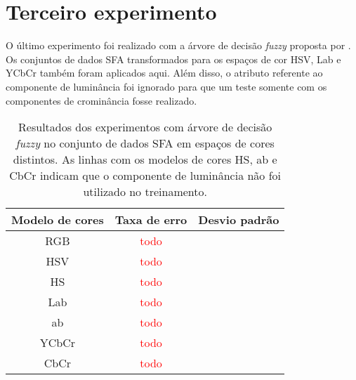 \section{Terceiro experimento}
\label{sec:experimento_tres}
O último experimento foi realizado com a árvore de decisão \emph{fuzzy} proposta por \citet{cintra:13}. Os conjuntos de dados SFA transformados para os espaços de cor HSV, Lab e YCbCr também foram aplicados aqui. Além disso, o atributo referente ao componente de luminância foi ignorado para que um teste somente com os componentes de crominância fosse realizado.

\begin{table}[!htpb]
\centering
\begin{small}
\setlength{\tabcolsep}{8pt}

\begin{tabular}{|c|c|c|}\hline
 Modelo de cores & Taxa de erro & Desvio padrão \\ \hline
 RGB   & \textcolor{red}{todo} & \\ \hline
 HSV   & \textcolor{red}{todo} & \\ \hline
 HS    & \textcolor{red}{todo} & \\ \hline
 Lab   & \textcolor{red}{todo} & \\ \hline
 ab    & \textcolor{red}{todo} & \\ \hline
 YCbCr & \textcolor{red}{todo} & \\ \hline
 CbCr  & \textcolor{red}{todo} & \\ \hline

\end{tabular}
\end{small}
\caption[Resultados dos experimentos com árvore de decisão \emph{fuzzy} no conjunto de dados SFA em espaços de cores distintos]{Resultados dos experimentos com árvore de decisão \emph{fuzzy} no conjunto de dados SFA em espaços de cores distintos. As linhas com os modelos de cores HS, ab e CbCr indicam que o componente de luminância não foi utilizado no treinamento.}
\label{tab:resultados_experimento_tres}
\end{table}